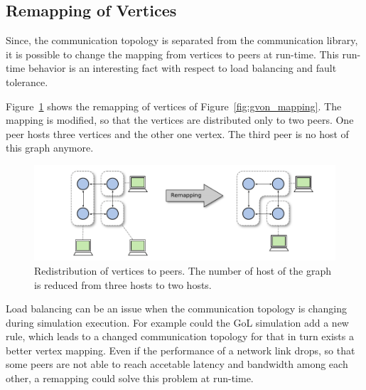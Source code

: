 \subsection{Remapping of Vertices}
\label{sec:remapping}
Since, the communication topology is separated from the communication
library, it is possible to change the mapping from vertices to peers
at run-time. This run-time behavior is an interesting fact with respect to
load balancing and fault tolerance.


Figure~\ref{fig:gvon_remapping} shows the remapping of
vertices of Figure~\ref{fig:gvon_mapping}. The mapping is modified, so that the
vertices are distributed only to two peers. One peer hosts three
vertices and the other one vertex. The third peer is no host of this
graph anymore.

\begin{figure}[H]
  \centering
  \includegraphics[width=\textwidth]{graphics/30_gvon_remapping}
  \caption{Redistribution of vertices to peers. The number of host of
    the graph is reduced from three hosts to two hosts.}
  \label{fig:gvon_remapping}
\end{figure}

Load balancing can be an issue when the communication topology is
changing during simulation execution. For example could the GoL
simulation add a new rule, which leads to a changed communication
topology for that in turn exists a better vertex mapping.  Even if the
performance of a network link drops, so that some peers are not able
to reach accetable latency and bandwidth among each other, a
remapping could solve this problem at run-time.

